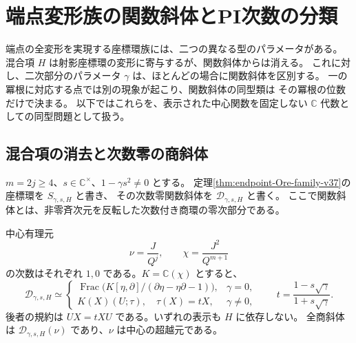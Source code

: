 \section{端点変形族の関数斜体とPI次数の分類}
\label{sec:endpoint-birational-v38}

端点の全変形を実現する座標環族には、二つの異なる型のパラメータがある。
混合項 $H$ は射影座標環の変形に寄与するが、関数斜体からは消える。
これに対し、二次部分のパラメータ $\gamma$ は、ほとんどの場合に関数斜体を区別する。
一の冪根に対応する点では別の現象が起こり、関数斜体の同型類は
その冪根の位数だけで決まる。
以下ではこれらを、表示された中心関数を固定しない
$\mathbb C$ 代数としての同型問題として扱う。

\subsection{混合項の消去と次数零の商斜体}

$m=2j\ge4$、$s\in\mathbb C^\times$、$1-\gamma s^2\ne0$ とする。
定理\ref{thm:endpoint-Ore-family-v37}の座標環を $S_{\gamma,s,H}$ と書き、
その次数零関数斜体を $\mathscr D_{\gamma,s,H}$ と書く。
ここで関数斜体とは、非零斉次元を反転した次数付き商環の零次部分である。

\begin{proposition}[中心の有理パラメータと関数斜体]
\label{prop:endpoint-division-v38}
中心有理元
\[
 \nu=\frac{J}{Q^j},\qquad
 \chi=\frac{J^2}{Q^{m+1}}
\]
の次数はそれぞれ $1,0$ である。$K=\mathbb C(\chi)$ とすると、
\[
 \mathscr D_{\gamma,s,H}\simeq
 \begin{cases}
  \operatorname{Frac}\bigl(K[\eta,\partial]/(\partial\eta-\eta\partial-1)\bigr),
     &\gamma=0,\\[2pt]
  K(X)(U;\tau),\quad \tau(X)=tX,
     &\gamma\ne0,
 \end{cases}
 \qquad
 t=\dfrac{1-s\sqrt\gamma}{1+s\sqrt\gamma}.
\]
後者の規約は $UX=tXU$ である。いずれの表示も $H$ に依存しない。
全商斜体は $\mathscr D_{\gamma,s,H}(\nu)$ であり、$\nu$ は中心の超越元である。
\end{proposition}

